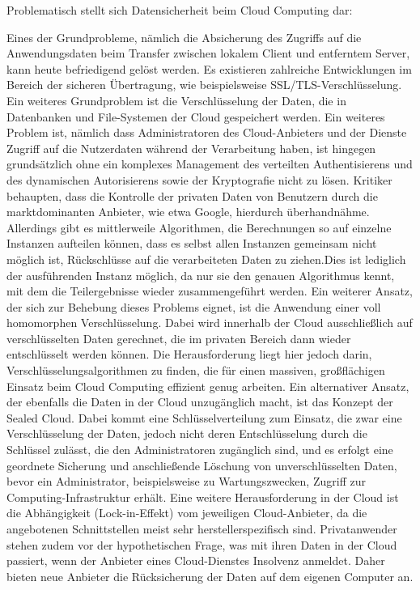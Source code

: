 Problematisch stellt sich Datensicherheit beim Cloud Computing dar:

Eines der Grundprobleme, nämlich die Absicherung des Zugriffs auf die Anwendungsdaten beim Transfer zwischen lokalem Client und entferntem Server, kann heute befriedigend gelöst werden. Es existieren zahlreiche Entwicklungen im Bereich der sicheren Übertragung, wie beispielsweise SSL/TLS-Verschlüsselung. Ein weiteres Grundproblem ist die Verschlüsselung der Daten, die in Datenbanken und File-Systemen der Cloud gespeichert werden.
Ein weiteres Problem ist, nämlich dass Administratoren des Cloud-Anbieters und der Dienste Zugriff auf die Nutzerdaten während der Verarbeitung haben, ist hingegen grundsätzlich ohne ein komplexes Management des verteilten Authentisierens und des dynamischen Autorisierens sowie der Kryptografie nicht zu lösen.
Kritiker behaupten, dass die Kontrolle der privaten Daten von Benutzern durch die marktdominanten Anbieter, wie etwa Google, hierdurch überhandnähme. Allerdings gibt es mittlerweile Algorithmen, die Berechnungen so auf einzelne Instanzen aufteilen können, dass es selbst allen Instanzen gemeinsam nicht möglich ist, Rückschlüsse auf die verarbeiteten Daten zu ziehen.Dies ist lediglich der ausführenden Instanz möglich, da nur sie den genauen Algorithmus kennt, mit dem die Teilergebnisse wieder zusammengeführt werden. Ein weiterer Ansatz, der sich zur Behebung dieses Problems eignet, ist die Anwendung einer voll homomorphen Verschlüsselung. Dabei wird innerhalb der Cloud ausschließlich auf verschlüsselten Daten gerechnet, die im privaten Bereich dann wieder entschlüsselt werden können. Die Herausforderung liegt hier jedoch darin, Verschlüsselungsalgorithmen zu finden, die für einen massiven, großflächigen Einsatz beim Cloud Computing effizient genug arbeiten.
Ein alternativer Ansatz, der ebenfalls die Daten in der Cloud unzugänglich macht, ist das Konzept der Sealed Cloud. Dabei kommt eine Schlüsselverteilung zum Einsatz, die zwar eine Verschlüsselung der Daten, jedoch nicht deren Entschlüsselung durch die Schlüssel zulässt, die den Administratoren zugänglich sind, und es erfolgt eine geordnete Sicherung und anschließende Löschung von unverschlüsselten Daten, bevor ein Administrator, beispielsweise zu Wartungszwecken, Zugriff zur Computing-Infrastruktur erhält.
Eine weitere Herausforderung in der Cloud ist die Abhängigkeit (Lock-in-Effekt) vom jeweiligen Cloud-Anbieter, da die angebotenen Schnittstellen meist sehr herstellerspezifisch sind. Privatanwender stehen zudem vor der hypothetischen Frage, was mit ihren Daten in der Cloud passiert, wenn der Anbieter eines Cloud-Dienstes Insolvenz anmeldet. Daher bieten neue Anbieter die Rücksicherung der Daten auf dem eigenen Computer an.


